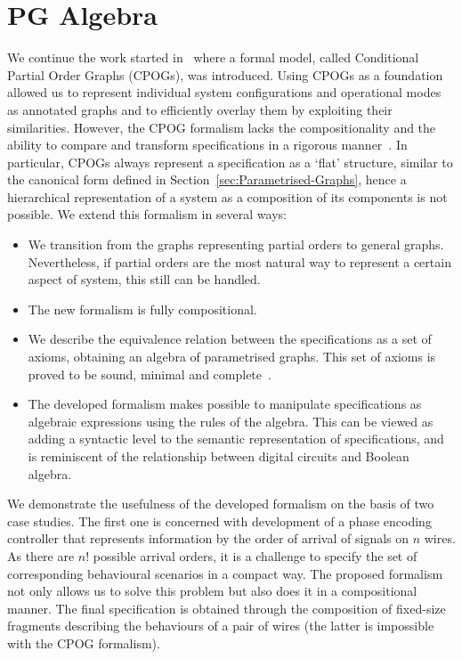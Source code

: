 \section{PG Algebra}

We continue the work started in~\cite{2010_mokhov_ieee}
where a formal model, called Conditional Partial Order Graphs (CPOGs),
was introduced. Using CPOGs as a foundation allowed us to represent individual system configurations
and operational modes as annotated graphs and to efficiently overlay them by exploiting
their similarities. However, the CPOG formalism lacks the compositionality
and the ability to compare and transform specifications in a rigorous
manner~\cite{pg_algebra}. In particular, CPOGs always represent a specification as
a `flat' structure, similar to the canonical form defined in Section~\ref{sec:Parametrised-Graphs},
hence a hierarchical representation of a system as a composition of
its components is not possible. We extend this formalism in several
ways:

\begin{itemize}
\item We transition from the graphs representing partial orders to general graphs.
Nevertheless, if partial orders are the most natural way to represent
a certain aspect of system, this still can be handled.
\item The new formalism is fully compositional.
\item We describe the equivalence relation between the specifications as
a set of axioms, obtaining an algebra of parametrised graphs. This set of axioms is proved
to be sound, minimal and complete~\cite{pg_algebra}.
\item The developed formalism makes possible to manipulate specifications as
algebraic expressions using the rules of the algebra. This
can be viewed as adding a syntactic level to the semantic representation
of specifications, and is reminiscent of the relationship between digital
circuits and Boolean algebra.
\end{itemize}
We demonstrate the usefulness of the developed formalism on the basis of two case
studies. The first one is concerned with development of a phase encoding
controller that represents information by the order of arrival of
signals on $n$ wires. As there are $n!$ possible arrival orders,
it is a challenge to specify the set of corresponding behavioural
scenarios in a compact way. The proposed formalism not only allows us
to solve this problem but also does it in a compositional manner. The final specification is obtained through the composition of fixed-size fragments
describing the behaviours of a pair of wires (the latter is impossible
with the CPOG formalism).



